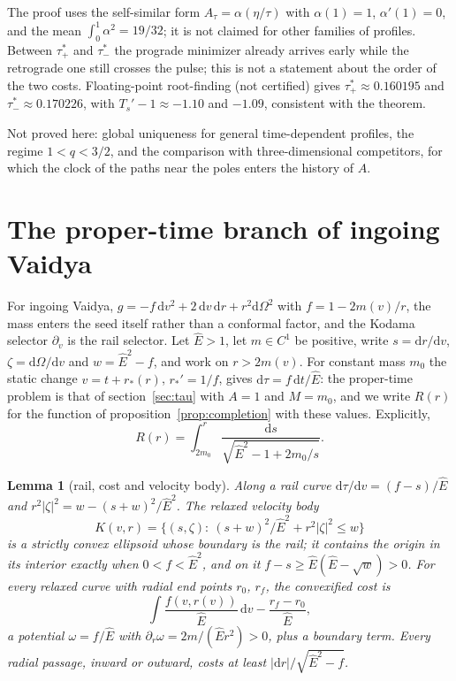 \documentclass[aip,jmp,amsmath,amssymb,reprint]{revtex4-2}
\newcommand{\Ehat}{\hat E}
\newcommand{\dd}{\mathrm{d}}
\theoremstyle{plain}
\newtheorem{lemma}[proposition]{Lemma}
\theoremstyle{definition}
\begin{document}
The proof uses the self-similar form $A_\tau=\alpha(\eta/\tau)$ with $\alpha(1)=1$, $\alpha'(1)=0$, and the mean
$\int_0^1\alpha^2=19/32$; it is not claimed for other families of profiles. Between $\tau_+^*$ and $\tau_-^*$ the
prograde minimizer already arrives early while the retrograde one still crosses the pulse; this is
not a statement about the order of the two costs. Floating-point root-finding (not certified)
gives $\tau_+^*\approx0.160195$ and $\tau_-^*\approx0.170226$, with $T_s'-1\approx-1.10$ and $-1.09$, consistent with the
theorem.

Not proved here: global uniqueness for general time-dependent profiles, the regime
$1<q<3/2$, and the comparison with three-dimensional competitors, for which
the clock of the paths near the poles enters the history of $A$.

\section{The proper-time branch of ingoing Vaidya}
\label{sec:vaidya-tau}
For ingoing Vaidya, $g=-f\,\dd v^2+2\,\dd v\,\dd r+r^2\dd\Omega^2$ with $f=1-2m(v)/r$, the mass
enters the seed itself rather than a conformal factor, and the Kodama selector $\partial_v$ is
the rail selector. Let $\Ehat>1$, let $m\in C^1$ be positive, write $s=\dd r/\dd v$,
$\zeta=\dd\Omega/\dd v$ and $w=\Ehat^2-f$, and work on $r>2m(v)$. For constant mass $m_0$ the
static change $v=t+r_*(r)$, $r_*'=1/f$, gives $\dd\tau=f\,\dd t/\Ehat$: the proper-time problem
is that of section~\ref{sec:tau} with $A=1$ and $M=m_0$, and we write $R(r)$ for the function
of proposition~\ref{prop:completion} with these values. Explicitly,
\[
 R(r)=\int_{2m_0}^{r}\frac{\dd s}{\sqrt{\Ehat^2-1+2m_0/s}}.
\]

\begin{lemma}[rail, cost and velocity body]\label{lem:vaidya-rail}
Along a rail curve $\dd\tau/\dd v=(f-s)/\Ehat$ and $r^2|\zeta|^2=w-(s+w)^2/\Ehat^2$. The
relaxed velocity body
\[
  K(v,r)=\{(s,\zeta):\ (s+w)^2/\Ehat^2+r^2|\zeta|^2\le w\}
\]
is a strictly convex ellipsoid whose boundary is the rail; it contains the origin in its
interior exactly when $0<f<\Ehat^2$, and on it $f-s\ge\Ehat(\Ehat-\sqrt w)>0$. For every
relaxed curve with radial end points $r_0$, $r_f$, the convexified cost is
\[
  \int\frac{f(v,r(v))}{\Ehat}\,\dd v-\frac{r_f-r_0}{\Ehat},
\]
a potential $\omega=f/\Ehat$ with $\partial_r\omega=2m/(\Ehat r^2)>0$, plus a boundary term. Every
radial passage, inward or outward, costs at least $|\dd r|/\sqrt{\Ehat^2-f}$.
\end{lemma}
\end{document}
